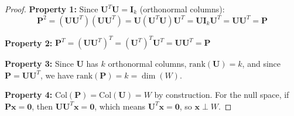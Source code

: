 \documentclass[12pt]{article}
\numberwithin{equation}{section}
\newcommand{\vect}[1]{\boldsymbol{#1}}   %
\newcommand{\mat}[1]{\mathbf{#1}}        %
\theoremstyle{plain}
\theoremstyle{definition}
\theoremstyle{remark}
\begin{document}
\begin{proof}
\textbf{Property 1:} Since $\mat{U}^T\mat{U} = \mat{I}_k$ (orthonormal columns):
$$\mat{P}^2 = (\mat{U}\mat{U}^T)(\mat{U}\mat{U}^T) = \mat{U}(\mat{U}^T\mat{U})\mat{U}^T = \mat{U}\mat{I}_k\mat{U}^T = \mat{U}\mat{U}^T = \mat{P}$$

\textbf{Property 2:} $\mat{P}^T = (\mat{U}\mat{U}^T)^T = (\mat{U}^T)^T\mat{U}^T = \mat{U}\mat{U}^T = \mat{P}$

\textbf{Property 3:} Since $\mat{U}$ has $k$ orthonormal columns, $\text{rank}(\mat{U}) = k$, and since $\mat{P} = \mat{U}\mat{U}^T$, we have $\text{rank}(\mat{P}) = k = \dim(W)$.

\textbf{Property 4:} $\text{Col}(\mat{P}) = \text{Col}(\mat{U}) = W$ by construction. For the null space, if $\mat{P}\vect{x} = \vect{0}$, then $\mat{U}\mat{U}^T\vect{x} = \vect{0}$, which means $\mat{U}^T\vect{x} = \vect{0}$, so $\vect{x} \perp W$.
\end{proof}
\end{document}

